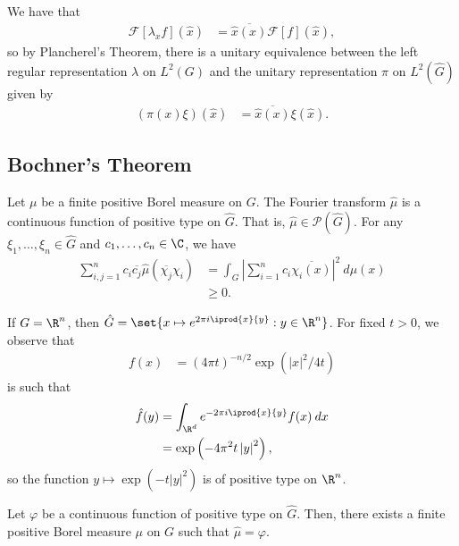 \documentclass[10pt]{mypackage}
\begin{document}
We have that
\begin{align*}
  \mathcal{F}\left[ \lambda_xf \right]\left( \hat{x} \right) &= \overline{\hat{x}(x)} \mathcal{F}\left[ f \right]\left( \hat{x} \right),
\end{align*}
so by Plancherel's Theorem, there is a unitary equivalence between the left regular representation $\lambda$ on $L^2\left( G \right)$ and the unitary representation $\pi$ on $L^2\left( \hat{G} \right)$ given by
\begin{align*}
  \left( \pi(x)\xi \right)\left( \hat{x} \right) &= \overline{\hat{x}\left( x \right)}\xi\left( \hat{x} \right).
\end{align*}
\subsection{Bochner's Theorem}%
Let $\mu$ be a finite positive Borel measure on $G$. The Fourier transform $\hat{\mu}$ is a continuous function of positive type on $\hat{G}$. That is, $\hat{\mu}\in \mathcal{P}\left( \hat{G} \right)$. For any $\xi_1,\dots,\xi_n\in \hat{G}$ and $c_1,\dots,c_n\in \C$, we have
\begin{align*}
  \sum_{i,j=1}^{n}c_i \overline{c_j}\hat{\mu}\left( \overline{\chi_j}\chi_i \right) &= \int_{G}^{} \left\vert \sum_{i=1}^{n}c_i \overline{\chi_i\left( x \right)} \right\vert^2\:d\mu(x)\\
                                                                                    &\geq 0.
\end{align*}
\begin{example}
  If $G = \R^n$, then $\hat{G} = \set{x\mapsto e^{2\pi i \iprod{x}{y}} : y\in \R^n}$. For fixed $t > 0$, we observe that
  \begin{align*}
    f(x) &= \left( 4\pi t \right)^{-n/2} \exp\left( \left\vert x \right\vert^2/4t \right)
  \end{align*}
  is such that 
  \begin{align*}
    \hat{f}(y) &= \int_{\R^d}^{} e^{-2\pi i \iprod{x}{y}}f(x)\:dx\\
               &= \exp\left( -4\pi^2t\left\vert y \right\vert^2 \right),
  \end{align*}
  so the function $y\mapsto \exp\left( -t\left\vert y \right\vert^2 \right)$ is of positive type on $\R^n$.
\end{example}
\begin{theorem}
  Let $\varphi$ be a continuous function of positive type on $\hat{G}$. Then, there exists a finite positive Borel measure $\mu$ on $G$ such that $\hat{\mu} = \varphi$.
\end{theorem}
\end{document}
